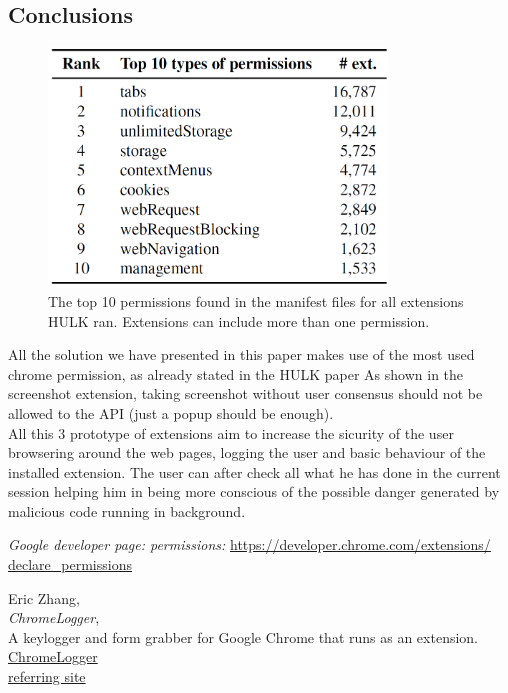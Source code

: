 \documentclass[12pt]{article}
\begin{document}
\begin{multicols}{2}
\section*{Conclusions}
\begin{figure}[H]
	\begin{center}
		\includegraphics[width=9cm]{permission.png}
		\caption{The top 10 permissions found in the manifest
			files for all extensions HULK ran. Extensions can include			
			more than one permission.}
	\end{center}
\end{figure}
All the solution we have presented in this paper makes use of the most used chrome permission, as already stated in the HULK paper\cite{HULK}
As shown in the screenshot extension, taking screenshot without user consensus should not be allowed to the API (just a popup should be enough). \\
All this 3 prototype of extensions aim to increase the sicurity of the user browsering around the web pages, logging the user and basic behaviour of the installed extension. The user can after check all what he has done in the current session helping him in being more conscious of the possible danger generated by malicious code running in background.
\begin{thebibliography}{3}
	\emph{Google developer page: permissions:}
	\href{https://developer.chrome.com/extensions/declare_permissions}{https://developer.chrome.com/extensions/\\declare\_permissions}
	
	Eric Zhang,\\
	\emph{ChromeLogger},\\
A keylogger and form grabber for Google Chrome that runs as an extension.\\
\href{https://github.com/Xeroday/ChromeLogger}{ChromeLogger}\\
\href{https://www.ericzhang.me/projects/chromelogger/}{referring site}


\end{thebibliography}
\end{multicols}
\end{document}
